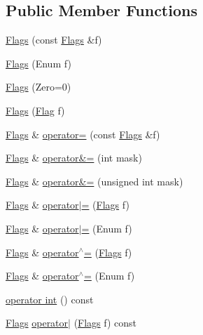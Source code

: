 \subsection*{Public Member Functions}
\begin{DoxyCompactItemize}
\item 
\hyperlink{classprism_1_1_flags_ab702770c2483a4faaa20e5cb53a0cc1d}{Flags} (const \hyperlink{classprism_1_1_flags}{Flags} \&f)
\item 
\hyperlink{classprism_1_1_flags_acb2acd31ec112f36935e83f6b30fb2a2}{Flags} (Enum f)
\item 
\hyperlink{classprism_1_1_flags_a4a4b320bab3416ec612e3d7fb8d5bc9f}{Flags} (Zero=0)
\item 
\hyperlink{classprism_1_1_flags_ad84d23a80b3d05f919c5173716aee953}{Flags} (\hyperlink{classprism_1_1_flag}{Flag} f)
\item 
\hyperlink{classprism_1_1_flags}{Flags} \& \hyperlink{classprism_1_1_flags_a417a716b1fe682f70a5f9d892f9f52ae}{operator=} (const \hyperlink{classprism_1_1_flags}{Flags} \&f)
\item 
\hyperlink{classprism_1_1_flags}{Flags} \& \hyperlink{classprism_1_1_flags_a0dce2c8d69f4070adb183fd4ecd32c72}{operator\&=} (int mask)
\item 
\hyperlink{classprism_1_1_flags}{Flags} \& \hyperlink{classprism_1_1_flags_a10e8d99b32cd66730fdf5c925df8d835}{operator\&=} (unsigned int mask)
\item 
\hyperlink{classprism_1_1_flags}{Flags} \& \hyperlink{classprism_1_1_flags_ae45501369741bec949c438e33abaa691}{operator$\vert$=} (\hyperlink{classprism_1_1_flags}{Flags} f)
\item 
\hyperlink{classprism_1_1_flags}{Flags} \& \hyperlink{classprism_1_1_flags_ac154dae287ae3200a19ccdd4236750ad}{operator$\vert$=} (Enum f)
\item 
\hyperlink{classprism_1_1_flags}{Flags} \& \hyperlink{classprism_1_1_flags_adbd2fc9df07db796dfe16e9cf1476110}{operator$^\wedge$=} (\hyperlink{classprism_1_1_flags}{Flags} f)
\item 
\hyperlink{classprism_1_1_flags}{Flags} \& \hyperlink{classprism_1_1_flags_ac5ace902a279edd8e5be31e4668f853a}{operator$^\wedge$=} (Enum f)
\item 
\hyperlink{classprism_1_1_flags_ad914643c0ea6304a14e738970946b146}{operator int} () const 
\item 
\hyperlink{classprism_1_1_flags}{Flags} \hyperlink{classprism_1_1_flags_a69ec60ebffd8888278650c1eb6def089}{operator$\vert$} (\hyperlink{classprism_1_1_flags}{Flags} f) const 

\end{DoxyCompactItemize}
